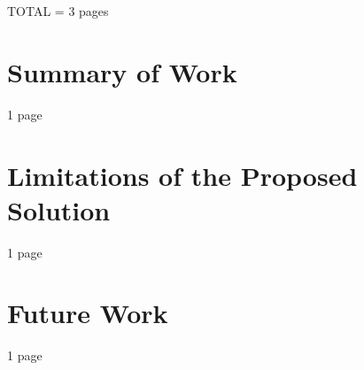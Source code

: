 \label{sec:Conclusion}

TOTAL = 3 pages

\section{Summary of Work}

1 page

\section{Limitations of the Proposed Solution}\label{sec:Limitations}

1 page

\section{Future Work}

1 page